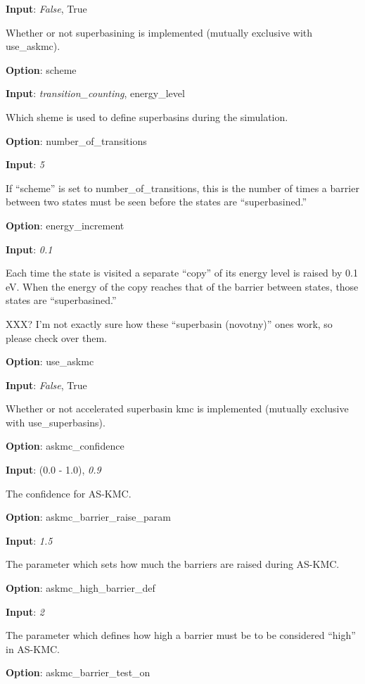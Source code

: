 \documentclass{article}
\begin{document}
\noindent\textbf{Input}:  \emph{False}, True

Whether or not superbasining is implemented (mutually exclusive with use\_askmc).

\noindent\textbf{Option}:  scheme

\noindent\textbf{Input}:  \emph{transition\_counting}, energy\_level

Which sheme is used to define superbasins during the simulation.

\noindent\textbf{Option}:  number\_of\_transitions

\noindent\textbf{Input}:  \emph{5}

If ``scheme'' is set to number\_of\_transitions, this is the number of times a barrier between two states must be seen before the states are ``superbasined.''

\noindent\textbf{Option}:  energy\_increment

\noindent\textbf{Input}:  \emph{0.1}

Each time the state is visited a separate ``copy'' of its energy level is raised by 0.1 eV.  When the energy of the copy reaches that of the barrier between states, those states are ``superbasined.''

XXX?  I'm not exactly sure how these ``superbasin (novotny)'' ones work, so please check over them.

\noindent\textbf{Option}:  use\_askmc

\noindent\textbf{Input}:  \emph{False}, True

Whether or not accelerated superbasin kmc is implemented (mutually exclusive with use\_superbasins).

\noindent\textbf{Option}:  askmc\_confidence

\noindent\textbf{Input}:  (0.0 - 1.0), \emph{0.9}

The confidence for AS-KMC.

\noindent\textbf{Option}:  askmc\_barrier\_raise\_param

\noindent\textbf{Input}:  \emph{1.5}

The parameter which sets how much the barriers are raised during AS-KMC.

\noindent\textbf{Option}:  askmc\_high\_barrier\_def

\noindent\textbf{Input}:  \emph{2}

The parameter which defines how high a barrier must be to be considered ``high'' in AS-KMC.

\noindent\textbf{Option}:  askmc\_barrier\_test\_on
\end{document}
